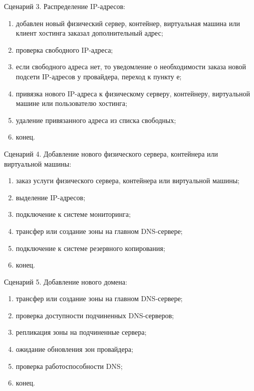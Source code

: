 Сценарий 3. Распределение IP-адресов:
\begin{enumerate}
  \item добавлен новый физический сервер, контейнер, виртуальная машина или клиент хостинга заказал дополнительный адрес;
  \item проверка свободного IP-адреса;
  \item если свободного адреса нет, то уведомление о необходимости заказа новой подсети IP-адресов у провайдера, переход к пункту е;
  \item привязка нового IP-адреса к физическому серверу, контейнеру, виртуальной машине или пользователю хостинга;
  \item удаление привязанного адреса из списка свободных;
  \item конец.
\end{enumerate}

Сценарий 4. Добавление нового физического сервера, контейнера или виртуальной машины:
\begin{enumerate}
  \item заказ услуги физического сервера, контейнера или виртуальной машины;
  \item выделение IP-адресов;
  \item подключение к системе мониторинга;
  \item трансфер или создание зоны на главном DNS-сервере;
  \item подключение к системе резервного копирования;
  \item конец.
\end{enumerate}

Сценарий 5. Добавление нового домена:
\begin{enumerate}
  \item трансфер или создание зоны на главном DNS-сервере;
  \item проверка доступности подчиненных DNS-серверов;
  \item репликация зоны на подчиненные сервера;
  \item ожидание обновления зон провайдера;
  \item проверка работоспособности DNS;
  \item конец.
\end{enumerate}

\clearpage
